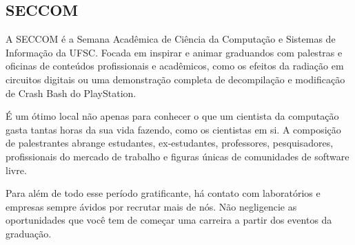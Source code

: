 \subsection{SECCOM} 
A SECCOM é a Semana Acadêmica de Ciência da Computação e Sistemas de Informação da UFSC. Focada em inspirar e animar graduandos com palestras e oficinas de conteúdos profissionais e acadêmicos, como os efeitos da radiação em circuitos digitais ou uma demonstração completa de decompilação e modificação de Crash Bash do PlayStation. 

É um ótimo local não apenas para conhecer o que um cientista da computação gasta tantas horas da sua vida fazendo, como os cientistas em si. A composição de palestrantes abrange estudantes, ex-estudantes, professores, pesquisadores, profissionais do mercado de trabalho e figuras únicas de comunidades de software livre.

Para além de todo esse período gratificante, há contato com laboratórios e empresas sempre ávidos por recrutar mais de nós. Não negligencie as oportunidades que você tem de começar uma carreira a partir dos eventos da graduação.
